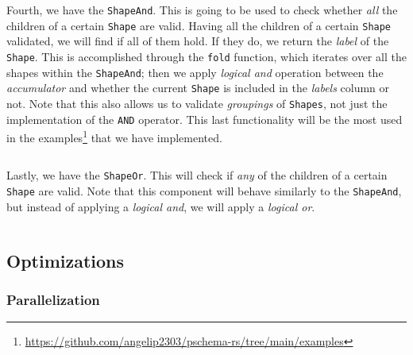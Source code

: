 \begin{code}
    \inputminted{rust}{code/listings/11-14_cardinality.rs}
\end{code}

Fourth, we have the \texttt{ShapeAnd}. This is going to be used to check whether \textit{all} the children of a certain \texttt{Shape} are valid. Having all the children of a certain \texttt{Shape} validated, we will find if all of them hold. If they do, we return the \textit{label} of the \texttt{Shape}. This is accomplished through the \texttt{fold} function, which iterates over all the shapes within the \texttt{ShapeAnd}; then we apply \textit{logical and} operation between the \textit{accumulator} and whether the current \texttt{Shape} is included in the \textit{labels} column or not. Note that this also allows us to validate \textit{groupings} of \texttt{Shapes}, not just the implementation of the \texttt{AND} operator. This last functionality will be the most used in the examples\footnote{\url{https://github.com/angelip2303/pschema-rs/tree/main/examples}} that we have implemented.

\begin{code}
    \inputminted{rust}{code/listings/11-12_and.rs}
\end{code}

Lastly, we have the \texttt{ShapeOr}. This will check if \textit{any} of the children of a certain \texttt{Shape} are valid. Note that this component will behave similarly to the \texttt{ShapeAnd}, but instead of applying a \textit{logical and}, we will apply a \textit{logical or}.

\begin{code}
    \inputminted{rust}{code/listings/11-13_or.rs}
\end{code}

\label{section:pschema-rs:optimizations}
\subsection{Optimizations}

\subsubsection{Parallelization}

